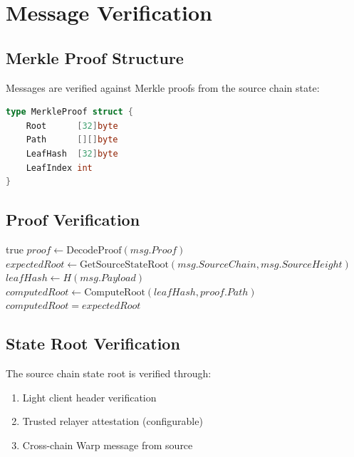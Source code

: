 \documentclass[11pt,twocolumn]{article}
\begin{document}
\section{Message Verification}

\subsection{Merkle Proof Structure}

Messages are verified against Merkle proofs from the source chain state:

\begin{lstlisting}[language=Go,basicstyle=\ttfamily\small]
type MerkleProof struct {
    Root      [32]byte
    Path      [][]byte
    LeafHash  [32]byte
    LeafIndex int
}
\end{lstlisting}

\subsection{Proof Verification}

\begin{algorithm}
\caption{Merkle Proof Verification}
\label{alg:verify-proof}
\begin{algorithmic}[1]
        \State \Return true 
    \EndIf
    \State $proof \gets \text{DecodeProof}(msg.Proof)$
    \State $expectedRoot \gets \text{GetSourceStateRoot}(msg.SourceChain, msg.SourceHeight)$
    \State $leafHash \gets H(msg.Payload)$
    \State $computedRoot \gets \text{ComputeRoot}(leafHash, proof.Path)$
    \State \Return $computedRoot = expectedRoot$
\EndProcedure
\end{algorithmic}
\end{algorithm}

\subsection{State Root Verification}

The source chain state root is verified through:
\begin{enumerate}
\item Light client header verification
\item Trusted relayer attestation (configurable)
\item Cross-chain Warp message from source
\end{enumerate}
\end{document}
